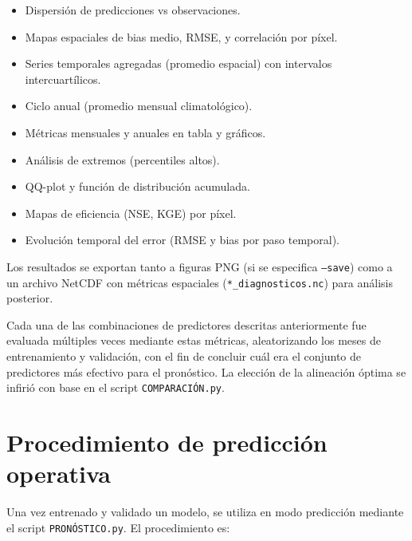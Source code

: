 \begin{itemize}
    \item Dispersión de predicciones vs observaciones.
    \item Mapas espaciales de bias medio, RMSE, y correlación por píxel.
    \item Series temporales agregadas (promedio espacial) con intervalos intercuartílicos.
    \item Ciclo anual (promedio mensual climatológico).
    \item Métricas mensuales y anuales en tabla y gráficos.
    \item Análisis de extremos (percentiles altos).
    \item QQ-plot y función de distribución acumulada.
    \item Mapas de eficiencia (NSE, KGE) por píxel.
    \item Evolución temporal del error (RMSE y bias por paso temporal).
\end{itemize}

Los resultados se exportan tanto a figuras PNG (si se especifica \texttt{--save}) como a un archivo NetCDF con métricas espaciales (\texttt{*\_diagnosticos.nc}) para análisis posterior.

Cada una de las combinaciones de predictores descritas anteriormente fue evaluada múltiples veces mediante estas métricas, aleatorizando los meses de entrenamiento y validación, con el fin de concluir cuál era el conjunto de predictores más efectivo para el pronóstico. La elección de la alineación óptima se infirió con base en el script \texttt{COMPARACIÓN.py}.

\section{Procedimiento de predicción operativa}
\label{sec:prediccion_operativa}

Una vez entrenado y validado un modelo, se utiliza en modo predicción mediante el script \texttt{PRONÓSTICO.py}. El procedimiento es:

